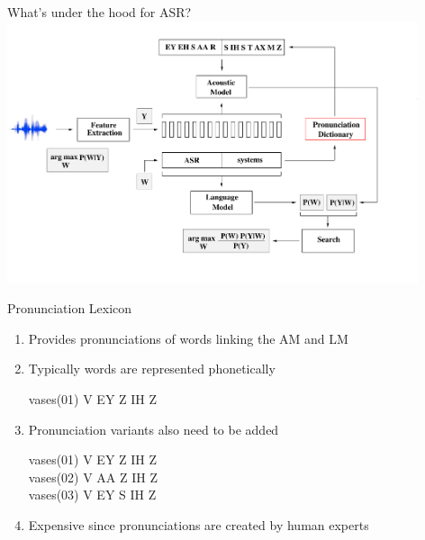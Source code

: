 \begin{frame}{What's under the hood for ASR?}
\includegraphics[height=77mm]{figures/b4}
\end{frame}

\begin{frame}{Pronunciation Lexicon}
\begin{enumerate}
\item Provides pronunciations of words \alert{linking} the AM and LM
\item Typically words are represented \alert{phonetically}
\begin{center}
vases(01)                      V EY Z IH Z \\
\end{center}
\item Pronunciation \alert{variants} also need to be added\\
\begin{center}
vases(01)                      V EY Z IH Z \\
vases(02)                      V AA Z IH Z \\
vases(03)                      V EY S IH Z \\
\end{center}
\item \alert{Expensive} since pronunciations are created by human experts
\end{enumerate}
\end{frame}

